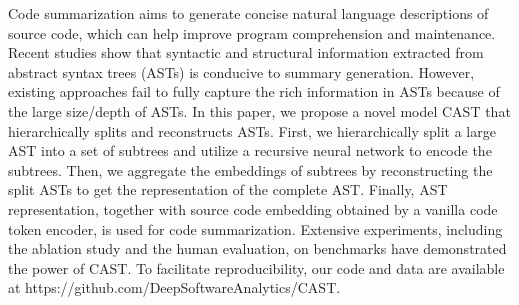 Code summarization aims to generate concise natural language descriptions of source code, which can help improve program comprehension and maintenance. Recent studies show that syntactic and structural information extracted from abstract syntax trees (ASTs) is conducive to summary generation. However, existing approaches fail to fully capture the rich information in ASTs because of the large size/depth of ASTs. In this paper, we propose a novel model CAST that hierarchically splits and reconstructs ASTs. First, we hierarchically split a large AST into a set of subtrees and utilize a recursive neural network to encode the subtrees. Then, we aggregate the embeddings of subtrees by reconstructing the split ASTs to get the representation of the complete AST. Finally, AST representation, together with source code embedding obtained by a vanilla code token encoder, is used for code summarization. Extensive experiments, including the ablation study and the human evaluation, on benchmarks have demonstrated the power of CAST. To facilitate reproducibility, our code and data are available at https://github.com/DeepSoftwareAnalytics/CAST.
